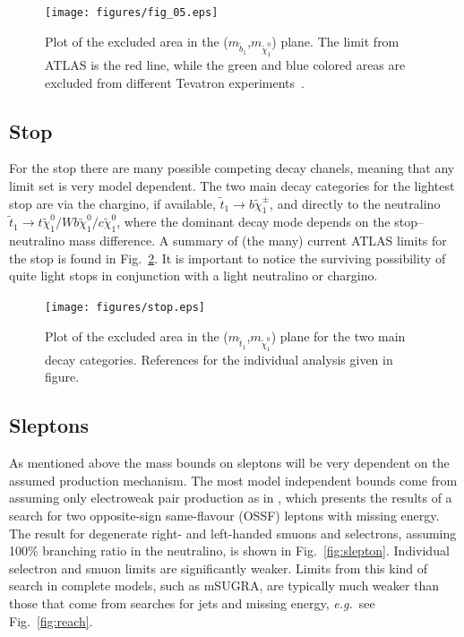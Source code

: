 \documentclass[notes.tex]{subfiles}
\begin{document}
\begin{figure}[h!]
\begin{center}
\texttt{[image: figures/fig\_05.eps]} 
\caption{Plot of the excluded area in the ($m_{\tilde{b}_1}$,$m_{\tilde{\chi}_1^0}$) plane. The limit from ATLAS is the red line, while the green and blue colored areas are excluded from different Tevatron experiments~\cite{Aad:2013ija}.\label{fig:sbottom}}
\end{center}
\end{figure}

\subsection{Stop}
For the stop there are many possible competing decay chanels, meaning that any limit set is very model dependent. The two main decay categories for the lightest stop are via the chargino, if available, $\tilde{t}_1\to b \tilde{\chi}^\pm_1$, and directly to the neutralino $\tilde{t}_1\to t\tilde{\chi}^0_1/ Wb \tilde{\chi}^0_1/ c\tilde{\chi}^0_1$, where the dominant decay mode depends on the stop--neutralino mass difference. A summary of (the many) current ATLAS limits for the stop is found in Fig.~\ref{fig:stop}. It is important to notice the surviving possibility of quite light stops in conjunction with a light neutralino or chargino.

\begin{figure}[h!]
\begin{center}
\texttt{[image: figures/stop.eps]} 
\caption{Plot of the excluded area in the ($m_{\tilde{t}_1}$,$m_{\tilde{\chi}^0_1}$) plane for the two main decay categories. References for the individual analysis given in figure.\label{fig:stop}}
\end{center}
\end{figure}

\subsection{Sleptons}
As mentioned above the mass bounds on sleptons will be very dependent on the assumed production mechanism. The most model independent bounds come from assuming only electroweak pair production as in \cite{ATLAS-CONF-2013-049}, which presents the results of a search for two opposite-sign same-flavour (OSSF) leptons with missing energy. The result for degenerate right- and left-handed smuons and selectrons, assuming 100\% branching ratio in the neutralino, is shown in Fig.~\ref{fig:slepton}. Individual selectron and smuon limits are significantly weaker. Limits from this kind of search in complete models, such as mSUGRA, are typically much weaker than those that come from searches for jets and missing energy, {\it e.g.}\ see Fig.~\ref{fig:reach}.
\end{document}
